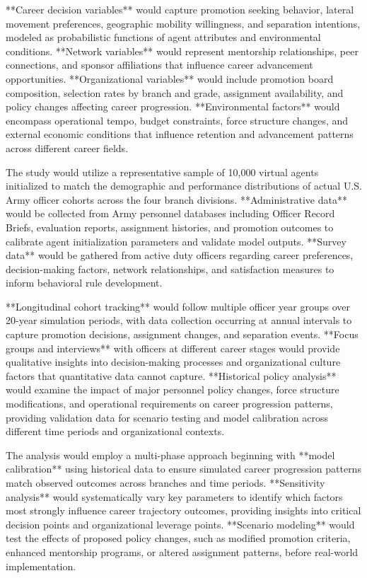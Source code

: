 \documentclass[main.tex]{subfiles}
\begin{document}
**Career decision variables** would capture promotion seeking behavior, lateral movement preferences, geographic mobility willingness, and separation intentions, modeled as probabilistic functions of agent attributes and environmental conditions. **Network variables** would represent mentorship relationships, peer connections, and sponsor affiliations that influence career advancement opportunities. **Organizational variables** would include promotion board composition, selection rates by branch and grade, assignment availability, and policy changes affecting career progression. **Environmental factors** would encompass operational tempo, budget constraints, force structure changes, and external economic conditions that influence retention and advancement patterns across different career fields.


The study would utilize a representative sample of 10,000 virtual agents initialized to match the demographic and performance distributions of actual U.S. Army officer cohorts across the four branch divisions. **Administrative data** would be collected from Army personnel databases including Officer Record Briefs, evaluation reports, assignment histories, and promotion outcomes to calibrate agent initialization parameters and validate model outputs. **Survey data** would be gathered from active duty officers regarding career preferences, decision-making factors, network relationships, and satisfaction measures to inform behavioral rule development.

**Longitudinal cohort tracking** would follow multiple officer year groups over 20-year simulation periods, with data collection occurring at annual intervals to capture promotion decisions, assignment changes, and separation events. **Focus groups and interviews** with officers at different career stages would provide qualitative insights into decision-making processes and organizational culture factors that quantitative data cannot capture. **Historical policy analysis** would examine the impact of major personnel policy changes, force structure modifications, and operational requirements on career progression patterns, providing validation data for scenario testing and model calibration across different time periods and organizational contexts.


The analysis would employ a multi-phase approach beginning with **model calibration** using historical data to ensure simulated career progression patterns match observed outcomes across branches and time periods. **Sensitivity analysis** would systematically vary key parameters to identify which factors most strongly influence career trajectory outcomes, providing insights into critical decision points and organizational leverage points. **Scenario modeling** would test the effects of proposed policy changes, such as modified promotion criteria, enhanced mentorship programs, or altered assignment patterns, before real-world implementation.
\end{document}
